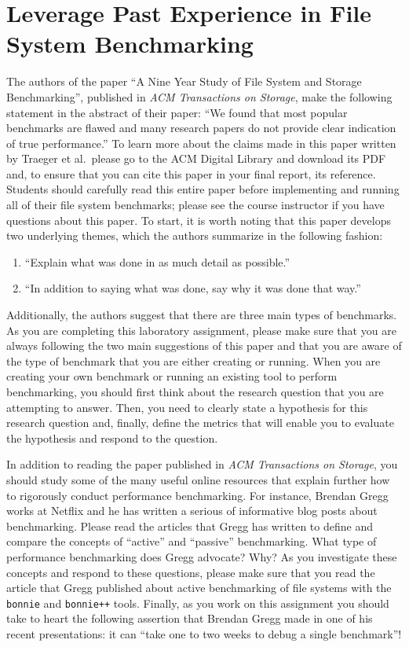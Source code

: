 \section*{Leverage Past Experience in File System Benchmarking}

The authors of the paper ``A Nine Year Study of File System and Storage Benchmarking'', published in {\em ACM
Transactions on Storage}, make the following statement in the abstract of their paper: ``We found that most popular
benchmarks are flawed and many research papers do not provide clear indication of true performance.'' To learn more
about the claims made in this paper written by Traeger et al.\ please go to the ACM Digital Library and download its PDF
and, to ensure that you can cite this paper in your final report, its  reference. Students should
carefully read this entire paper before implementing and running all of their file system benchmarks; please see the
course instructor if you have questions about this paper. To start, it is worth noting that this paper develops two
underlying themes, which the authors summarize in the following fashion:

\begin{enumerate}
  \itemsep 0in
  \item ``Explain what was done in as much detail as possible.''
  \item ``In addition to saying what was done, say why it was done that way.''
\end{enumerate}

Additionally, the authors suggest that there are three main types of benchmarks. As you are completing this laboratory
assignment, please make sure that you are always following the two main suggestions of this paper and that you are aware
of the type of benchmark that you are either creating or running. When you are creating your own benchmark or running an
existing tool to perform benchmarking, you should first think about the research question that you are attempting to
answer. Then, you need to clearly state a hypothesis for this research question and, finally, define the
metrics that will enable you to evaluate the hypothesis and respond to the question.

In addition to reading the paper published in {\em ACM Transactions on Storage}, you should study some of the many
useful online resources that explain further how to rigorously conduct performance benchmarking. For instance, Brendan
Gregg works at Netflix and he has written a serious of informative blog posts about benchmarking. Please read the
articles that Gregg has written to define and compare the concepts of ``active'' and ``passive'' benchmarking. What type
of performance benchmarking does Gregg advocate? Why? As you investigate these concepts and respond to these questions,
please make sure that you read the article that Gregg published about active benchmarking of file systems with the {\tt
  bonnie} and {\tt bonnie++} tools. Finally, as you work on this assignment you should take to heart the following
  assertion that Brendan Gregg made in one of his recent presentations: it can ``take one to two weeks to debug a single
  benchmark''!

